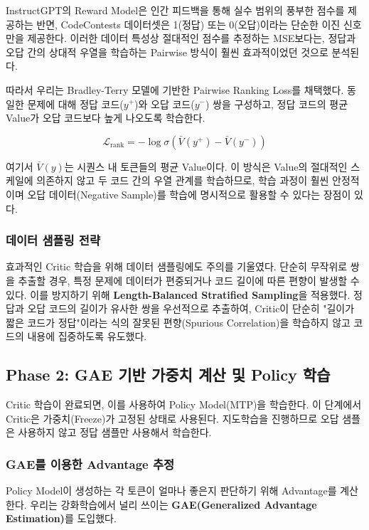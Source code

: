 \documentclass[11pt,a4paper]{article}
\begin{document}
InstructGPT의 Reward Model은 인간 피드백을 통해 실수 범위의 풍부한 점수를 제공하는 반면, CodeContests 데이터셋은 1(정답) 또는 0(오답)이라는 단순한 이진 신호만을 제공한다. 이러한 데이터 특성상 절대적인 점수를 추정하는 MSE보다는, 정답과 오답 간의 상대적 우열을 학습하는 Pairwise 방식이 훨씬 효과적이었던 것으로 분석된다.

따라서 우리는 Bradley-Terry 모델에 기반한 Pairwise Ranking Loss를 채택했다. 동일한 문제에 대해 정답 코드($y^+$)와 오답 코드($y^-$) 쌍을 구성하고, 정답 코드의 평균 Value가 오답 코드보다 높게 나오도록 학습한다.

\begin{equation}
\mathcal{L}_{\text{rank}} = -\log \sigma(\bar{V}(y^+) - \bar{V}(y^-))
\end{equation}

여기서 $\bar{V}(y)$는 시퀀스 내 토큰들의 평균 Value이다. 이 방식은 Value의 절대적인 스케일에 의존하지 않고 두 코드 간의 우열 관계를 학습하므로, 학습 과정이 훨씬 안정적이며 오답 데이터(Negative Sample)를 학습에 명시적으로 활용할 수 있다는 장점이 있다.

\subsubsection{데이터 샘플링 전략}
효과적인 Critic 학습을 위해 데이터 샘플링에도 주의를 기울였다. 단순히 무작위로 쌍을 추출할 경우, 특정 문제에 데이터가 편중되거나 코드 길이에 따른 편향이 발생할 수 있다. 이를 방지하기 위해 \textbf{Length-Balanced Stratified Sampling}을 적용했다. 정답과 오답 코드의 길이가 유사한 쌍을 우선적으로 추출하여, Critic이 단순히 "길이가 짧은 코드가 정답"이라는 식의 잘못된 편향(Spurious Correlation)을 학습하지 않고 코드의 내용에 집중하도록 유도했다.

\subsection{Phase 2: GAE 기반 가중치 계산 및 Policy 학습}

Critic 학습이 완료되면, 이를 사용하여 Policy Model(MTP)을 학습한다. 이 단계에서 Critic은 가중치(Freeze)가 고정된 상태로 사용된다. 지도학습을 진행하므로 오답 샘플은 사용하지 않고 정답 샘플만 사용해서 학습한다.

\subsubsection{GAE를 이용한 Advantage 추정}
Policy Model이 생성하는 각 토큰이 얼마나 좋은지 판단하기 위해 Advantage를 계산한다. 우리는 강화학습에서 널리 쓰이는 \textbf{GAE(Generalized Advantage Estimation)}를 도입했다.
\end{document}
